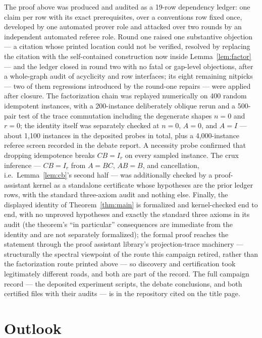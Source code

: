 \documentclass[11pt]{article}
\begin{document}
The proof above was produced and audited as a 19-row dependency ledger: one claim per
row with its exact prerequisites, over a conventions row fixed once, developed by one
automated prover role and attacked over two rounds by an independent automated referee
role. Round one raised one substantive objection --- a citation whose printed location
could not be verified, resolved by replacing the citation with the self-contained
construction now inside Lemma~\ref{lem:factor} --- and the ledger closed in round two
with no fatal or gap-level objections, after a whole-graph audit of acyclicity and row
interfaces; its eight remaining nitpicks --- two of them regressions introduced by the
round-one repairs --- were applied after closure.
The factorization chain was replayed numerically on 400 random idempotent
instances, with a 200-instance deliberately oblique rerun and a 500-pair test of the
trace commutation including the degenerate shapes $n = 0$ and $r = 0$; the identity
itself was separately checked at $n = 0$, $A = 0$, and $A = I$ --- about 1{,}100
instances in the deposited probes in total, plus a 4{,}000-instance referee screen
recorded in the debate report. A necessity probe confirmed that dropping idempotence
breaks $CB = I_r$ on every sampled instance. The crux inference --- $CB = I_r$ from
$A = BC$, $AB = B$, and cancellation, i.e.\ Lemma~\ref{lem:cb}'s second half --- was
additionally checked by a proof-assistant kernel as a standalone certificate whose
hypotheses are the prior ledger rows, with the standard three-axiom audit and nothing
else. Finally, the displayed identity of Theorem~\ref{thm:main} is formalized and
kernel-checked end to end, with no unproved hypotheses and exactly the standard three
axioms in its audit (the theorem's ``in particular'' consequences are immediate from
the identity and are not separately formalized);
the formal proof reaches the statement through the proof assistant library's
projection-trace machinery --- structurally the spectral viewpoint of the route this
campaign retired, rather than the factorization route printed above --- so discovery
and certification took legitimately different roads, and both are part of the record.
The full campaign record --- the deposited experiment scripts, the debate
conclusions, and both certified files with their audits --- is in the repository cited
on the title page.

\section{Outlook}\label{sec:outlook}
\end{document}
